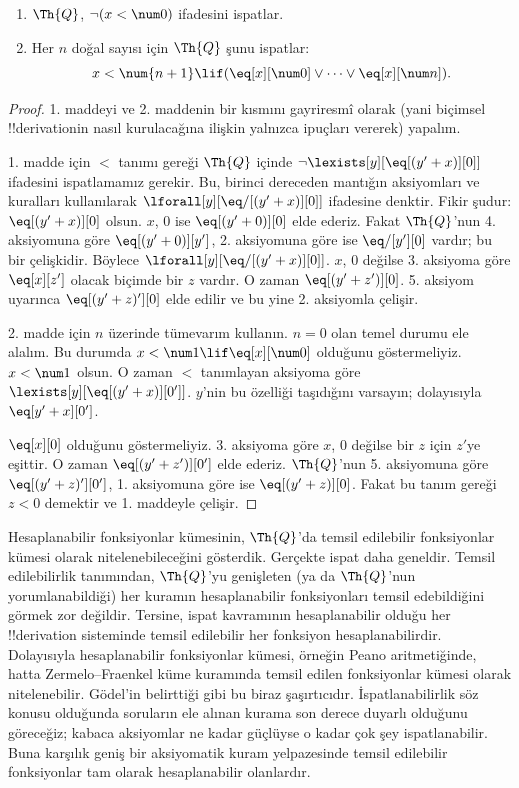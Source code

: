 \documentclass[../../../include/open-logic-section]{subfiles}
\begin{document}
\begin{lem}
\begin{enumerate}
\item $\Th{Q}$, $\lnot (x < \num 0)$ ifadesini ispatlar.
\item Her $n$ doğal sayısı için $\Th{Q}$ şunu ispatlar:
\[
x < \num {n+1} \lif (\eq[x][\num 0] \lor \dots \lor \eq[x][\num n]).
\]
\end{enumerate}
\end{lem}

\begin{proof}
1. maddeyi ve 2. maddenin bir kısmını gayriresmî olarak (yani biçimsel
!!{derivation}{}in nasıl kurulacağına ilişkin yalnızca ipuçları vererek)
yapalım.

1. madde için $<$ tanımı gereği $\Th{Q}$ içinde
$\lnot \lexists[y][\eq[(y'+x)][0]]$ ifadesini ispatlamamız gerekir. Bu,
birinci dereceden mantığın aksiyomları ve kuralları kullanılarak
$\lforall[y][\eq/[(y' + x)][0]]$ ifadesine denktir. Fikir şudur:
$\eq[(y'+x)][0]$ olsun. $x$, $0$ ise $\eq[(y' + 0)][0]$ elde ederiz. Fakat
$\Th{Q}$'nun 4. aksiyomuna göre $\eq[(y' + 0)][y']$, 2. aksiyomuna göre ise
$\eq/[y'][0]$ vardır; bu bir çelişkidir. Böylece
$\lforall[y][\eq/[(y' +x)][0]]$. $x$, $0$ değilse 3. aksiyoma göre
$\eq[x][z']$ olacak biçimde bir $z$ vardır. O zaman
$\eq[(y' + z')][0]$. 5. aksiyom uyarınca $\eq[(y' + z)'][0]$ elde edilir ve
bu yine 2. aksiyomla çelişir.

2. madde için $n$ üzerinde tümevarım kullanın. $n=0$ olan temel durumu ele
alalım. Bu durumda $x < \num 1 \lif \eq[x][\num 0]$ olduğunu göstermeliyiz.
$x < \num 1$ olsun. O zaman $<$ tanımlayan aksiyoma göre
$\lexists[y][\eq[(y'+x)][0']]$. $y$'nin bu özelliği taşıdığını varsayın;
dolayısıyla $\eq[y'+x][0']$.

$\eq[x][0]$ olduğunu göstermeliyiz. 3. aksiyoma göre $x$, $0$ değilse bir
$z$ için $z'$ye eşittir. O zaman $\eq[(y' + z')][0']$ elde ederiz.
$\Th{Q}$'nun 5. aksiyomuna göre $\eq[(y'+z)'][0']$, 1. aksiyomuna göre ise
$\eq[(y' + z)][0]$. Fakat bu tanım gereği $z < 0$ demektir ve 1. maddeyle
çelişir.
\end{proof}

\begin{explain}
Hesaplanabilir fonksiyonlar kümesinin, $\Th{Q}$'da temsil edilebilir
fonksiyonlar kümesi olarak nitelenebileceğini gösterdik. Gerçekte ispat daha
geneldir. Temsil edilebilirlik tanımından, $\Th{Q}$'yu genişleten (ya da
$\Th{Q}$'nun yorumlanabildiği) her kuramın hesaplanabilir fonksiyonları temsil
edebildiğini görmek zor değildir. Tersine, ispat kavramının hesaplanabilir
olduğu her !!{derivation} sisteminde temsil edilebilir her fonksiyon
hesaplanabilirdir. Dolayısıyla hesaplanabilir fonksiyonlar kümesi, örneğin
Peano aritmetiğinde, hatta Zermelo--Fraenkel küme kuramında temsil edilen
fonksiyonlar kümesi olarak nitelenebilir. Gödel'in belirttiği gibi bu biraz
şaşırtıcıdır. İspatlanabilirlik söz konusu olduğunda soruların ele alınan
kurama son derece duyarlı olduğunu göreceğiz; kabaca aksiyomlar ne kadar
güçlüyse o kadar çok şey ispatlanabilir. Buna karşılık geniş bir aksiyomatik
kuram yelpazesinde temsil edilebilir fonksiyonlar tam olarak hesaplanabilir
olanlardır.
\end{explain}
\end{document}
